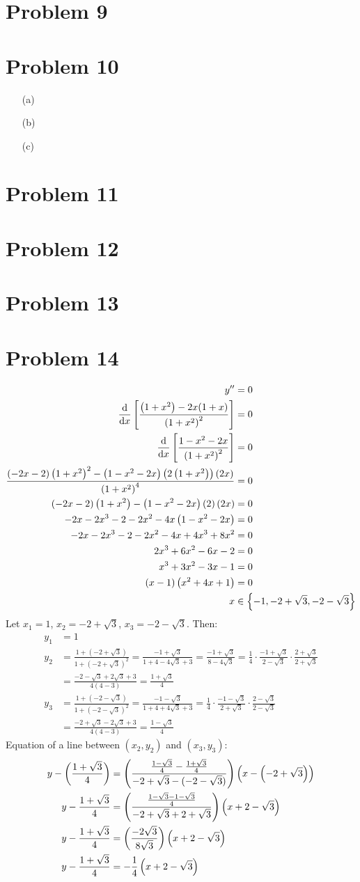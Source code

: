 \documentclass{article}
\newcommand*{\paren}[1]{\ensuremath\left(#1\right)}
\newcommand*{\problem}[1]{\section*{Problem #1}}
\newcommand*{\Deriv}[2][x]{\ensuremath{\dfrac{\mathrm{d}}{\mathrm{d}#1}\left[#2\right]}}
\begin{document}
\problem{9}


\problem{10}
\begin{itemize}
	\item[(a)]
	

	\item[(b)]
	

	\item[(c)]
	
	
\end{itemize}

\problem{11}


\problem{12}


\problem{13}


\problem{14}
\begin{align*}
	y''&=0 \\
	\Deriv{\frac{\paren{1+x^2}-2x(1+x)}{\paren{1+x^2}^2}}&=0 \\
	\Deriv{\frac{1-x^2-2x}{\paren{1+x^2}^2}}&=0 \\
	\frac{\paren{-2x-2}\paren{1+x^2}^2-\paren{1-x^2-2x}\paren{2\paren{1+x^2}}\paren{2x}}{\paren{1+x^2}^4}&=0 \\
	\paren{-2x-2}\paren{1+x^2}-\paren{1-x^2-2x}\paren{2}\paren{2x}&=0 \\
	-2x-2x^3-2-2x^2-4x\paren{1-x^2-2x}&=0 \\
	-2x-2x^3-2-2x^2-4x+4x^3+8x^2&=0 \\
	2x^3+6x^2-6x-2&=0 \\
	x^3+3x^2-3x-1&=0 \\
	(x-1)\paren{x^2+4x+1}&=0 \\
	x&\in\left\{-1,-2+\sqrt{3},-2-\sqrt{3}\right\}
\end{align*}
Let $x_1=1$, $x_2=-2+\sqrt{3}$, $x_3=-2-\sqrt{3}$. Then:
\begin{align*}
	y_1&=1 \\
	y_2&=\frac{1+(-2+\sqrt{3})}{1+(-2+\sqrt{3})^2}
	=\frac{-1+\sqrt{3}}{1+4-4\sqrt{3}+3}
	=\frac{-1+\sqrt{3}}{8-4\sqrt{3}}
	=\frac{1}{4}\cdot\frac{-1+\sqrt{3}}{2-\sqrt{3}}\cdot\frac{2+\sqrt{3}}{2+\sqrt{3}} \\
	&=\frac{-2-\sqrt{3}+2\sqrt{3}+3}{4(4-3)}=\frac{1+\sqrt{3}}{4} \\
	y_3&=\frac{1+(-2-\sqrt{3})}{1+(-2-\sqrt{3})^2}
	=\frac{-1-\sqrt{3}}{1+4+4\sqrt{3}+3}
	=\frac{1}{4}\cdot\frac{-1-\sqrt{3}}{2+\sqrt{3}}\cdot\frac{2-\sqrt{3}}{2-\sqrt{3}} \\
	&=\frac{-2+\sqrt{3}-2\sqrt{3}+3}{4(4-3)}
	=\frac{1-\sqrt{3}}{4}
\end{align*}
Equation of a line between $(x_2,y_2)$ and $(x_3,y_3)$:
\begin{align*}
	y-\paren{\frac{1+\sqrt{3}}{4}}&=\paren{\frac{\frac{1-\sqrt{3}}{4}-\frac{1+\sqrt{3}}{4}}{-2+\sqrt{3}-(-2-\sqrt{3})}}\paren{x-\paren{-2+\sqrt{3}}} \\
	y-\frac{1+\sqrt{3}}{4}&=\paren{\frac{\frac{1-\sqrt{3}-1-\sqrt{3}}{4}}{-2+\sqrt{3}+2+\sqrt{3}}}\paren{x+2-\sqrt{3}} \\
	y-\frac{1+\sqrt{3}}{4}&=\paren{\frac{-2\sqrt{3}}{8\sqrt{3}}}\paren{x+2-\sqrt{3}} \\
	y-\frac{1+\sqrt{3}}{4}&=-\frac{1}{4}\paren{x+2-\sqrt{3}}
\end{align*}
\end{document}
